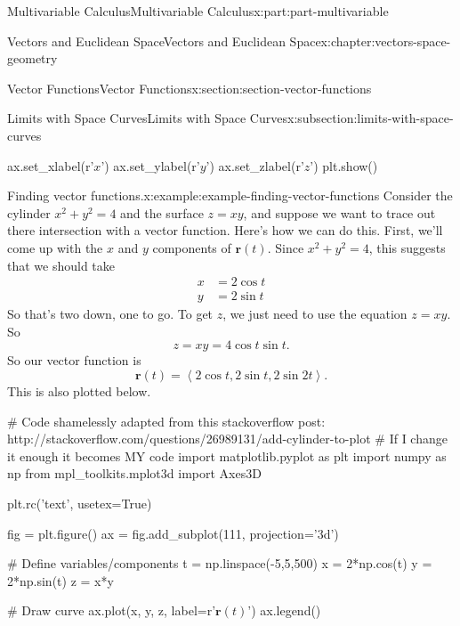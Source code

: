 \documentclass[twoside,10pt,]{tufte-book}
\numberwithin{equation}{part}
\newcommand{\dotprod}[1]{\left\langle #1 \right\rangle}
\begin{document}
\begin{partptx}{Multivariable Calculus}{}{Multivariable Calculus}{}{}{x:part:part-multivariable}
\begin{chapterptx}{Vectors and Euclidean Space}{}{Vectors and Euclidean Space}{}{}{x:chapter:vectors-space-geometry}
\begin{sectionptx}{Vector Functions}{}{Vector Functions}{}{}{x:section:section-vector-functions}
\begin{subsectionptx}{Limits with Space Curves}{}{Limits with Space Curves}{}{}{x:subsection:limits-with-space-curves}
\begin{sageinput}
ax.set_xlabel(r'$x$')
ax.set_ylabel(r'$y$')
ax.set_zlabel(r'$z$')
plt.show()
\end{sageinput}
\begin{example}{Finding vector functions.}{x:example:example-finding-vector-functions}%
Consider the cylinder \(x^{2}+y^{2}=4\) and the surface \(z=xy\), and suppose we want to trace out there intersection with a vector function. Here's how we can do this. First, we'll come up with the \(x\) and \(y\) components of \(\mathbf{r}(t)\). Since \(x^{2}+y^{2} = 4\), this suggests that we should take%
%
\begin{align*}
x & = 2\cos t \\
y & = 2\sin t 
\end{align*}
So that's two down, one to go. To get \(z\), we just need to use the equation \(z=xy\). So%
%
\begin{equation*}
z = xy = 4\cos t\sin t.
\end{equation*}
So our vector function is%
%
\begin{equation*}
\mathbf{r}(t) = \dotprod{2\cos t, 2\sin t, 2\sin 2t}.
\end{equation*}
This is also plotted below.%
\end{example}
\begin{sageinput}
# Code shamelessly adapted from this stackoverflow post: http://stackoverflow.com/questions/26989131/add-cylinder-to-plot
# If I change it enough it becomes MY code
import matplotlib.pyplot as plt
import numpy as np
from mpl_toolkits.mplot3d import Axes3D

plt.rc('text', usetex=True)

fig = plt.figure()
ax = fig.add_subplot(111, projection='3d')

# Define variables/components
t = np.linspace(-5,5,500)
x = 2*np.cos(t)
y = 2*np.sin(t)
z = x*y

# Draw curve
ax.plot(x, y, z, label=r'$\mathbf{r}(t)$')
ax.legend()


\end{sageinput}
\end{subsectionptx}
\end{sectionptx}
\end{chapterptx}
\end{partptx}
\end{document}
